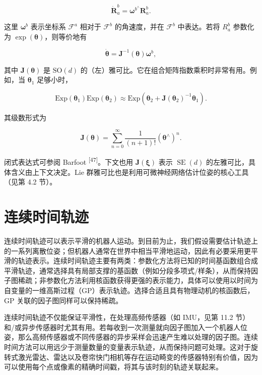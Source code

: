 \begin{equation}
\dot {\boldsymbol {R}} _ {a} ^ {b} = \boldsymbol {\omega} ^ {b ^ {\wedge}} \boldsymbol {R} _ {a} ^ {b}.\tag{2.32}
\end{equation}

这里 $\pmb\omega^b$ 表示坐标系 $\mathcal{F}^a$ 相对于 $\mathcal{F}^b$ 的角速度，并在 $\mathcal{F}^b$ 中表达。若将 $R_a^b$ 参数化为 $\exp(\pmb\theta)$，则等价地有

\begin{equation}
\dot {\pmb\theta} = \pmb J^{-1}(\pmb\theta)\pmb\omega^b,\tag{2.33}
\end{equation}

其中 $\pmb J(\pmb\theta)$ 是 $\mathrm{SO}(d)$ 的（左）雅可比。它在组合矩阵指数乘积时非常有用。例如，当 $\pmb\theta_1$ 足够小时，

\begin{equation}
\mathrm{Exp}(\pmb\theta_1)\mathrm{Exp}(\pmb\theta_2)\approx\mathrm{Exp}\left(\pmb\theta_2+\pmb J(\pmb\theta_2)^{-1}\pmb\theta_1\right).\tag{2.34}
\end{equation}

其级数形式为

\begin{equation}
\boldsymbol {J} (\boldsymbol {\theta}) = \sum_ {n = 0} ^ {\infty} \frac {1}{(n + 1) !} \left(\boldsymbol {\theta} ^ {\wedge}\right) ^ {n}.\tag{2.35}
\end{equation}

闭式表达式可参阅 Barfoot \textsuperscript{[47]}。下文也用 $\pmb J(\pmb\xi)$ 表示 $\operatorname{SE}(d)$ 的左雅可比，具体含义由上下文决定。Lie 群雅可比也是利用可微神经网络估计位姿的核心工具（见第 4.2 节）。

\section{连续时间轨迹}

连续时间轨迹可以表示平滑的机器人运动。到目前为止，我们假设需要估计轨迹上的一系列离散位姿；但机器人通常在世界中相当平滑地运动，因此有必要采用更平滑的轨迹表示。连续时间轨迹主要有两类：参数化方法将已知的时间基函数组合成平滑轨迹，通常选择具有局部支撑的基函数（例如分段多项式/样条），从而保持因子图稀疏；非参数化方法利用核函数获得更强的表示能力，具体可以使用以时间为自变量的一维高斯过程（GP）表示轨迹。选择合适且具有物理动机的核函数后，GP 关联的因子图同样可以保持稀疏。

连续时间轨迹不仅能保证平滑性，在处理高频传感器（如 IMU，见第 11.2 节）和/或异步传感器时尤其有用。若每收到一次测量就向因子图加入一个机器人位姿，那么高频传感器或不同传感器的异步采样会迅速产生难以处理的因子图。连续时间方法可以用远少于测量数量的变量表示轨迹，从而保持问题可处理。这对于旋转式激光雷达、雷达以及卷帘快门相机等存在运动畸变的传感器特别有价值，因为可以使用每个点或像素的精确时间戳，将其与该时刻的轨迹关联起来。

